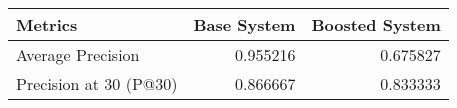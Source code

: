 \begin{tabular}{lrr}
\toprule
               Metrics &  Base System &  Boosted System \\
\midrule
     Average Precision &     0.955216 &        0.675827 \\
Precision at 30 (P@30) &     0.866667 &        0.833333 \\
\bottomrule
\end{tabular}
